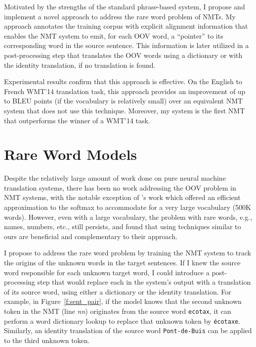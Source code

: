 Motivated by the strengths of the standard phrase-based system, I 
propose and implement a novel approach to address the rare word problem of NMTs.
My approach annotates the training corpus with 
explicit alignment information that enables the NMT system to emit, for each OOV word, a
``pointer'' to its corresponding word in the source sentence. This
information is later utilized in a post-processing step that translates
the OOV words using a dictionary or with the identity translation, if no translation is found.


Experimental results confirm that this approach is effective. On the English to French WMT'14
translation task, this approach provides an improvement of
up to \bestunkimp{} BLEU points (if the vocabulary is relatively small) 
over an equivalent NMT system that does not use this technique.
Moreover, my system is the first NMT that outperforms the winner of a WMT'14 task.


\section{Rare Word Models}
\label{sec:rare}
Despite the relatively large amount of work done on pure neural machine translation systems, 
there has been no work addressing the OOV problem in NMT systems, 
with the notable exception of 's work which offered 
an efficient approximation to the softmax to accommodate for a very large vocabulary (500K words). However, even with a large vocabulary, the problem with rare words, e.g., names, numbers, etc., still persists, and  found that using techniques similar to ours are beneficial and complementary to their approach.

I propose to address the rare word problem by training the NMT system
to track the origins of the unknown words in the target sentences.  If
I knew the source word responsible for each unknown target word, I could introduce
a post-processing step that would replace each \unksym{} in the system's output
with a translation of its source word, using 
either a dictionary or the identity translation.  For example, in
Figure~\ref{f:sent_pair}, if the model knows that the second unknown token 
in the NMT (line {\it nn}) originates from the source
word \texttt{ecotax}, it can perform a word dictionary lookup to
replace that unknown token by \texttt{\'{e}cotaxe}. Similarly, an
identity translation of the source word \texttt{Pont-de-Buis} can be
applied to the third unknown token.

